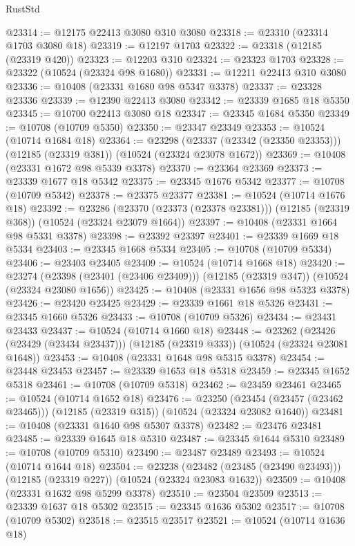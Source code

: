 \begin{lexlean}{RustStd}
\begin{coremodule}
@23314 := @12175 @22413 @3080 @310 @3080
@23318 := @23310 (@23314 @1703 @3080 @18)
@23319 := @12197 @1703
@23322 := @23318 (@12185 (@23319 @420))
@23323 := @12203 @310
@23324 := @23323 @1703
@23328 := @23322 (@10524 (@23324 @98 @1680))
@23331 := @12211 @22413 @310 @3080
@23336 := @10408 (@23331 @1680 @98 @5347 @3378)
@23337 := @23328 @23336
@23339 := @12390 @22413 @3080
@23342 := @23339 @1685 @18 @5350
@23345 := @10700 @22413 @3080 @18
@23347 := @23345 @1684 @5350
@23349 := @10708 (@10709 @5350)
@23350 := @23347 @23349
@23353 := @10524 (@10714 @1684 @18)
@23364 := @23298
    (@23337 (@23342 (@23350 @23353)))
    (@12185 (@23319 @381))
    (@10524 (@23324 @23078 @1672))
@23369 := @10408 (@23331 @1672 @98 @5339 @3378)
@23370 := @23364 @23369
@23373 := @23339 @1677 @18 @5342
@23375 := @23345 @1676 @5342
@23377 := @10708 (@10709 @5342)
@23378 := @23375 @23377
@23381 := @10524 (@10714 @1676 @18)
@23392 := @23286
    (@23370 (@23373 (@23378 @23381)))
    (@12185 (@23319 @368))
    (@10524 (@23324 @23079 @1664))
@23397 := @10408 (@23331 @1664 @98 @5331 @3378)
@23398 := @23392 @23397
@23401 := @23339 @1669 @18 @5334
@23403 := @23345 @1668 @5334
@23405 := @10708 (@10709 @5334)
@23406 := @23403 @23405
@23409 := @10524 (@10714 @1668 @18)
@23420 := @23274
    (@23398 (@23401 (@23406 @23409)))
    (@12185 (@23319 @347))
    (@10524 (@23324 @23080 @1656))
@23425 := @10408 (@23331 @1656 @98 @5323 @3378)
@23426 := @23420 @23425
@23429 := @23339 @1661 @18 @5326
@23431 := @23345 @1660 @5326
@23433 := @10708 (@10709 @5326)
@23434 := @23431 @23433
@23437 := @10524 (@10714 @1660 @18)
@23448 := @23262
    (@23426 (@23429 (@23434 @23437)))
    (@12185 (@23319 @333))
    (@10524 (@23324 @23081 @1648))
@23453 := @10408 (@23331 @1648 @98 @5315 @3378)
@23454 := @23448 @23453
@23457 := @23339 @1653 @18 @5318
@23459 := @23345 @1652 @5318
@23461 := @10708 (@10709 @5318)
@23462 := @23459 @23461
@23465 := @10524 (@10714 @1652 @18)
@23476 := @23250
    (@23454 (@23457 (@23462 @23465)))
    (@12185 (@23319 @315))
    (@10524 (@23324 @23082 @1640))
@23481 := @10408 (@23331 @1640 @98 @5307 @3378)
@23482 := @23476 @23481
@23485 := @23339 @1645 @18 @5310
@23487 := @23345 @1644 @5310
@23489 := @10708 (@10709 @5310)
@23490 := @23487 @23489
@23493 := @10524 (@10714 @1644 @18)
@23504 := @23238
    (@23482 (@23485 (@23490 @23493)))
    (@12185 (@23319 @227))
    (@10524 (@23324 @23083 @1632))
@23509 := @10408 (@23331 @1632 @98 @5299 @3378)
@23510 := @23504 @23509
@23513 := @23339 @1637 @18 @5302
@23515 := @23345 @1636 @5302
@23517 := @10708 (@10709 @5302)
@23518 := @23515 @23517
@23521 := @10524 (@10714 @1636 @18)

\end{coremodule}
\end{lexlean}
